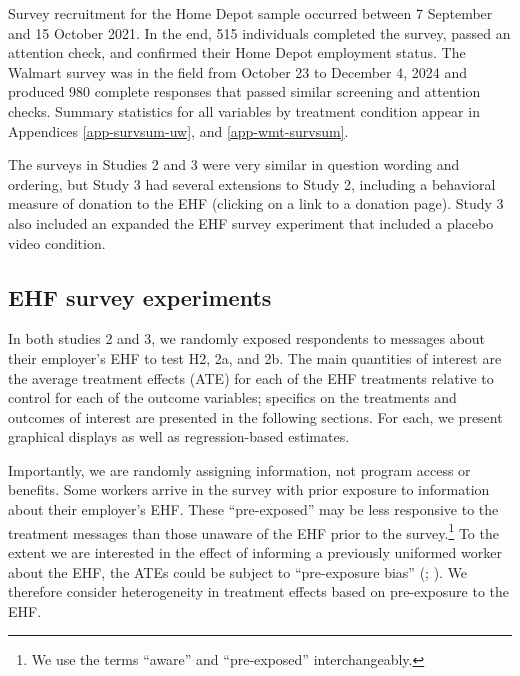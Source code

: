 \documentclass[
  11pt,
  oneside]{article}
\begin{document}
Survey recruitment for the Home Depot sample occurred between 7 September and 15 October 2021. In the end, 515 individuals completed the survey, passed an attention check, and confirmed their Home Depot employment status. The Walmart survey was in the field from October 23 to December 4, 2024 and produced 980 complete responses that passed similar screening and attention checks. Summary statistics for all variables by treatment condition appear in Appendices \ref{app-survsum-uw}, and \ref{app-wmt-survsum}.

The surveys in Studies 2 and 3 were very similar in question wording and ordering, but Study 3 had several extensions to Study 2, including a behavioral measure of donation to the EHF (clicking on a link to a donation page). Study 3 also included an expanded the EHF survey experiment that included a placebo video condition.

\subsection{EHF survey experiments}\label{ehf-survey-experiments}

In both studies 2 and 3, we randomly exposed respondents to messages about their employer's EHF to test H2, 2a, and 2b. The main quantities of interest are the average treatment effects (ATE) for each of the EHF treatments relative to control for each of the outcome variables; specifics on the treatments and outcomes of interest are presented in the following sections. For each, we present graphical displays as well as regression-based estimates.

Importantly, we are randomly assigning information, not program access or benefits. Some workers arrive in the survey with prior exposure to information about their employer's EHF. These ``pre-exposed'' may be less responsive to the treatment messages than those unaware of the EHF prior to the survey.\footnote{We use the terms ``aware'' and ``pre-exposed'' interchangeably.} To the extent we are interested in the effect of informing a previously uniformed worker about the EHF, the ATEs could be subject to ``pre-exposure bias'' (; ). We therefore consider heterogeneity in treatment effects based on pre-exposure to the EHF.
\end{document}

